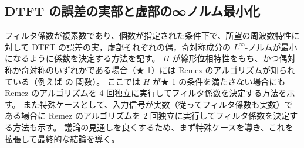     \subsection{DTFT の誤差の実部と虚部の∞ノルム最小化}
        \newcommand{\Ntp}{N_{\text{tp}}}
        \newcommand{\Hid}{H_{\text{id}}}
        \newcommand{\HidR}{H_{\text{id,r}}}
        \newcommand{\HidI}{H_{\text{id,i}}}
        \newcommand{\HidH}{H_{\text{id,H}}}
        \newcommand{\HidHr}{H_{\text{id,H,r}}}
        \newcommand{\HidHi}{H_{\text{id,H,i}}}
        \newcommand{\HidSH}{H_{\text{id,SH}}}
        \newcommand{\HidSHr}{H_{\text{id,SH,r}}}
        \newcommand{\HidSHi}{H_{\text{id,SH,i}}}
        \newcommand{\hes}{h_{\text{es}}}
        \newcommand{\hos}{h_{\text{os}}}
        \newcommand{\Hes}{H_{\text{es}}}
        \newcommand{\Hos}{H_{\text{os}}}
        \newcommand{\hr}{h_{\text{r}}}
        \newcommand{\hi}{h_{\text{i}}}
        \newcommand{\hrEs}{h_{\text{r,es}}}
        \newcommand{\hrOs}{h_{\text{r,os}}}
        \newcommand{\hiEs}{h_{\text{i,es}}}
        \newcommand{\hiOs}{h_{\text{i,os}}}
        \newcommand{\hesOpt}{h_{\text{es,opt}}}
        \newcommand{\hosOpt}{h_{\text{os,opt}}}
        \newcommand{\hopt}{h_{\text{opt}}}
        \newcommand{\hrEsOpt}{h_{\text{r,es,opt}}}
        \newcommand{\hrOsOpt}{h_{\text{r,os,opt}}}
        \newcommand{\hiEsOpt}{h_{\text{i,es,opt}}}
        \newcommand{\hiOsOpt}{h_{\text{i,os,opt}}}
        \newcommand{\HesOpt}{H_{\text{es,opt}}}
        \newcommand{\HosOpt}{H_{\text{os,opt}}}
        \newcommand{\Hopt}{H_{\text{opt}}}
        \newcommand{\HrEsOpt}{H_{\text{r,es,opt}}}
        \newcommand{\HrOsOpt}{H_{\text{r,os,opt}}}
        \newcommand{\HiEsOpt}{H_{\text{i,es,opt}}}
        \newcommand{\HiOsOpt}{H_{\text{i,os,opt}}}
        \newcommand{\eEs}{\mathrm{e}_{\text{es}}}
        \newcommand{\eOs}{\mathrm{e}_{\text{os}}}
        \newcommand{\eOpt}{\mathrm{e}_{\text{opt}}}
        \newcommand{\erEs}{\mathrm{e}_{\text{r,es}}}
        \newcommand{\erOs}{\mathrm{e}_{\text{r,os}}}
        \newcommand{\eiEs}{\mathrm{e}_{\text{i,es}}}
        \newcommand{\eiOs}{\mathrm{e}_{\text{i,os}}}
        フィルタ係数が複素数であり、個数が指定された条件下で、所望の周波数特性に対して DTFT の誤差の実，虚部それぞれの偶，奇対称成分の $L^\infty$-ノルムが最小になるように係数を決定する方法を記す。
        $H$ が線形位相特性をもち、かつ偶対称か奇対称のいずれかである場合（★ 1）には Remez のアルゴリズムが知られている（例えば \cite{DSP_JL} の  関数）。
        ここでは $H$ が★ 1 の条件を満たさない場合にも Remez のアルゴリズムを 4 回独立に実行してフィルタ係数を決定する方法を示す。
        また特殊ケースとして、入力信号が実数（従ってフィルタ係数も実数）である場合に Remez のアルゴリズムを 2 回独立に実行してフィルタ係数を決定する方法も示す。
        議論の見通しを良くするため、まず特殊ケースを導き、これを拡張して最終的な結論を導く。
